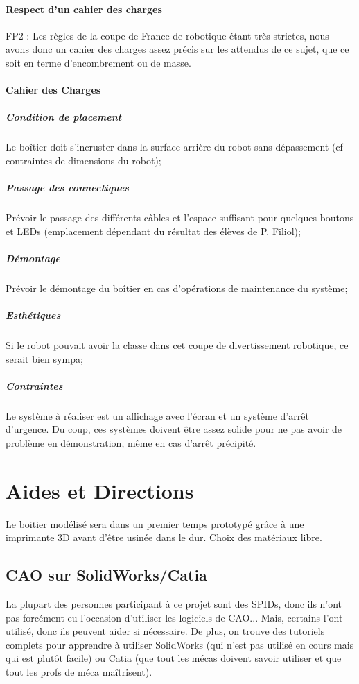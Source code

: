 \documentclass[fleqn,10pt]{SelfArx} %
\begin{document}
\paragraph{Respect d’un cahier des charges}
FP2 : Les règles de la coupe de France de robotique étant très strictes, nous avons donc un cahier des charges assez précis sur les attendus de ce sujet, que ce soit en terme d'encombrement ou de masse. 
\paragraph{Cahier des Charges}
\subparagraph{Condition de placement}
Le boîtier doit s'incruster dans la surface arrière du robot sans dépassement (cf contraintes de dimensions du robot);
\subparagraph{Passage des connectiques}
Prévoir le passage des différents câbles et l'espace suffisant pour quelques boutons et LEDs (emplacement dépendant du résultat des élèves de P. Filiol);
\subparagraph{Démontage}
Prévoir le démontage du boîtier en cas d'opérations de maintenance du système;
\subparagraph{Esthétiques}
Si le robot pouvait avoir la classe dans cet coupe de divertissement robotique, ce serait bien sympa;
\subparagraph{Contraintes}
Le système à réaliser est un affichage avec l'écran et un système d'arrêt d'urgence. Du coup, ces systèmes doivent être assez solide pour ne pas avoir de problème en démonstration, même en cas d'arrêt précipité.



\section{Aides et Directions}

Le boitier modélisé sera dans un premier temps prototypé grâce à une imprimante 3D avant d’être usinée dans le dur. Choix des matériaux libre.

\subsection{CAO sur SolidWorks/Catia}

La plupart des personnes participant à ce projet sont des SPIDs, donc ils n'ont pas forcément eu l'occasion d'utiliser les logiciels de CAO... Mais, certains l'ont utilisé, donc ils peuvent aider si nécessaire. De plus, on trouve des tutoriels complets pour apprendre à utiliser SolidWorks (qui n'est pas utilisé en cours mais qui est plutôt facile) ou Catia (que tout les mécas doivent savoir utiliser et que tout les profs de méca maîtrisent).
\end{document}
